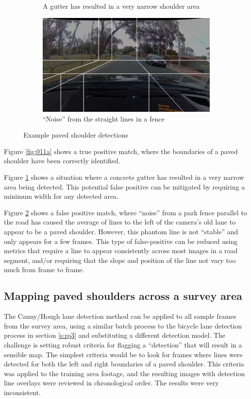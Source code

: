 \documentclass[11pt,twoside]{report}
\begin{document}
\begin{figure}[h]
\begin{subfigure}{0.3\textwidth}
	\caption{A gutter has resulted in a very narrow shoulder area}
	\label{fig:011b}
\end{subfigure}
\hfill
\begin{subfigure}{0.3\textwidth}
	\includegraphics[width=\textwidth]{f011_false_fence.png}
	\caption{``Noise'' from the straight lines in a fence}
	\label{fig:011c}
\end{subfigure}
\caption{Example paved shoulder detections}
\label{fig:011}
\end{figure}

Figure \ref{fig:011a} shows a true positive match, where the boundaries of a paved shoulder have been correctly identified.

Figure \ref{fig:011b} shows a situation where a concrete gutter has resulted in a very narrow area being detected.  This potential false positive can be mitigated by requiring a minimum width for any detected area.

Figure \ref{fig:011c} shows a false positive match, where ``noise'' from a park fence parallel to the road has caused the average of lines to the left of the camera's old lane to appear to be a paved shoulder.  However, this phantom line is not ``stable'' and only appears for a few frames.  This type of false-positive can be reduced using metrics that require a line to appear consistently across most images in a road segment, and/or requiring that the slope and position of the line not vary too much from frame to frame.


\subsection{Mapping paved shoulders across a survey area}

The Canny/Hough lane detection method can be applied to all sample frames from the survey area, using a similar batch process to the bicycle lane detection process in section \ref{s:rq3} and substituting a different detection model.  The challenge is setting robust criteria for flagging a ``detection'' that will result in a sensible map.  The simplest criteria would be to look for frames where lines were detected for both the left and right boundaries of a paved shoulder.  This criteria was applied to the training area footage, and the resulting images with detection line overlays were reviewed in chronological order.  The results were very inconsistent.
\end{document}
